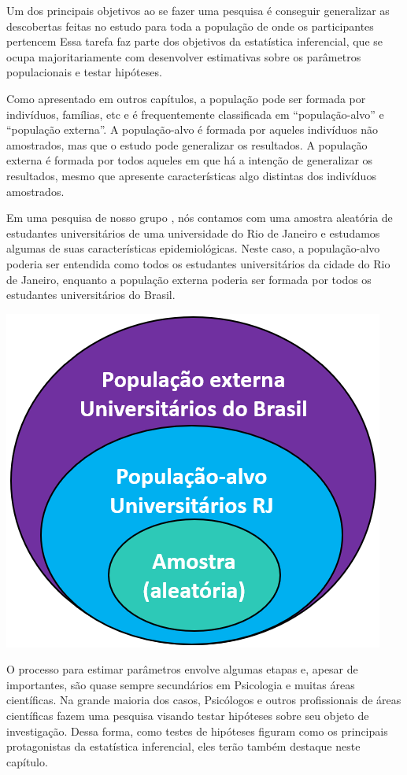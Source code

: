 \documentclass[
]{book}
\begin{document}
Um dos principais objetivos ao se fazer uma pesquisa é conseguir generalizar as descobertas feitas no estudo para toda a população de onde os participantes pertencem Essa tarefa faz parte dos objetivos da estatística inferencial, que se ocupa majoritariamente com desenvolver estimativas sobre os parâmetros populacionais e testar hipóteses.

Como apresentado em outros capítulos, a população pode ser formada por indivíduos, famílias, etc e é frequentemente classificada em ``população-alvo'' e ``população externa''. A população-alvo é formada por aqueles indivíduos não amostrados, mas que o estudo pode generalizar os resultados. A população externa é formada por todos aqueles em que há a intenção de generalizar os resultados, mesmo que apresente características algo distintas dos indivíduos amostrados.

Em uma pesquisa de nosso grupo \citep{AfonsoJunior2020}, nós contamos com uma amostra aleatória de estudantes universitários de uma universidade do Rio de Janeiro e estudamos algumas de suas características epidemiológicas. Neste caso, a população-alvo poderia ser entendida como todos os estudantes universitários da cidade do Rio de Janeiro, enquanto a população externa poderia ser formada por todos os estudantes universitários do Brasil.

\includegraphics{./img/cap_inferencia_amostra_populacao.png}

O processo para estimar parâmetros envolve algumas etapas e, apesar de importantes, são quase sempre secundários em Psicologia e muitas áreas científicas. Na grande maioria dos casos, Psicólogos e outros profissionais de áreas científicas fazem uma pesquisa visando testar hipóteses sobre seu objeto de investigação. Dessa forma, como testes de hipóteses figuram como os principais protagonistas da estatística inferencial, eles terão também destaque neste capítulo.
\end{document}
